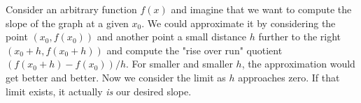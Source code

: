 Consider an arbitrary function $f(x)$ and imagine that we want to compute the slope of the graph at a given $x_0$. We could approximate it by considering the point $(x_0, f(x_0))$ and another point a small distance $h$ further to the right $(x_0+h, f(x_0+h))$ and compute the "rise over run" quotient $(f(x_0+h) - f(x_0)) / h$. For smaller and smaller $h$, the approximation would get better and better. Now we consider the limit as $h$ approaches zero. If that limit exists, it actually \emph{is} our desired slope.

